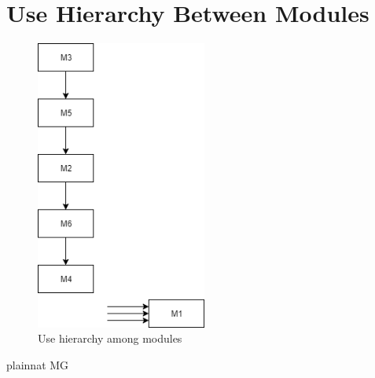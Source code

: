 \documentclass[12pt, titlepage]{article}
\begin{document}
\section{Use Hierarchy Between Modules} \label{SecUse}



\begin{figure}[H]
\centering
\includegraphics[width=0.5\textwidth]{UsesHierarchy.png}
\caption{Use hierarchy among modules}
\label{FigUH}
\end{figure}


 {plainnat}
 {MG}
\end{document}
